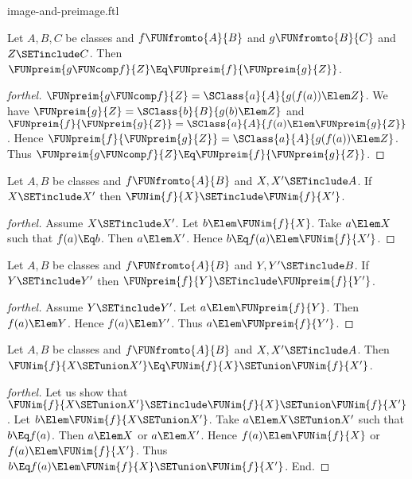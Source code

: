\documentclass{stex}
\begin{document}
\begin{smodule}{image-and-preimage.ftl}
\begin{proposition}[forthel]
  Let $A, B, C$ be classes and $f \FUNfromto{A}{B}$ and $g \FUNfromto{B}{C}$ and $Z \SETinclude C$.
  Then $\FUNpreim{g \FUNcomp f}{Z} \Eq \FUNpreim{f}{\FUNpreim{g}{Z}}$.
\end{proposition}
\begin{proof}[forthel]
  $\FUNpreim{g \FUNcomp f}{Z} = \SClass{a}{A}{g(f(a)) \Elem Z}$.
  We have $\FUNpreim{g}{Z} = \SClass{b}{B}{g(b) \Elem Z}$ and $\FUNpreim{f}{\FUNpreim{g}{Z}} = \SClass{a}{A}{f(a) \Elem \FUNpreim{g}{Z}}$.
  Hence $\FUNpreim{f}{\FUNpreim{g}{Z}} = \SClass{a}{A}{g(f(a)) \Elem Z}$.
  Thus $\FUNpreim{g \FUNcomp f}{Z} \Eq \FUNpreim{f}{\FUNpreim{g}{Z}}$.
\end{proof}

\begin{proposition}[forthel]
  Let $A, B$ be classes and $f \FUNfromto{A}{B}$ and $X, X' \SETinclude A$.
  If $X \SETinclude X'$ then $\FUNim{f}{X} \SETinclude \FUNim{f}{X'}$.
\end{proposition}
\begin{proof}[forthel]
  Assume $X \SETinclude X'$.
  Let $b \Elem \FUNim{f}{X}$.
  Take $a \Elem X$ such that $f(a) \Eq b$.
  Then $a \Elem X'$.
  Hence $b \Eq f(a) \Elem \FUNim{f}{X'}$.
\end{proof}

\begin{proposition}[forthel]
  Let $A, B$ be classes and $f \FUNfromto{A}{B}$ and $Y, Y' \SETinclude B$.
  If $Y \SETinclude Y'$ then $\FUNpreim{f}{Y} \SETinclude \FUNpreim{f}{Y'}$.
\end{proposition}
\begin{proof}[forthel]
  Assume $Y \SETinclude Y'$.
  Let $a \Elem \FUNpreim{f}{Y}$.
  Then $f(a) \Elem Y$.
  Hence $f(a) \Elem Y'$.
  Thus $a \Elem \FUNpreim{f}{Y'}$.
\end{proof}

\begin{proposition}[forthel]
  Let $A, B$ be classes and $f \FUNfromto{A}{B}$ and $X, X' \SETinclude A$.
  Then $\FUNim{f}{X \SETunion X'} \Eq \FUNim{f}{X} \SETunion \FUNim{f}{X'}$.
\end{proposition}
\begin{proof}[forthel]
  Let us show that $\FUNim{f}{X \SETunion X'} \SETinclude \FUNim{f}{X} \SETunion \FUNim{f}{X'}$.
    Let $b \Elem \FUNim{f}{X \SETunion X'}$.
    Take $a \Elem X \SETunion X'$ such that $b \Eq f(a)$.
    Then $a \Elem X$ or $a \Elem X'$.
    Hence $f(a) \Elem \FUNim{f}{X}$ or $f(a) \Elem \FUNim{f}{X'}$.
    Thus $b \Eq f(a) \Elem \FUNim{f}{X} \SETunion \FUNim{f}{X'}$.
  End.


\end{proof}
\end{smodule}
\end{document}
